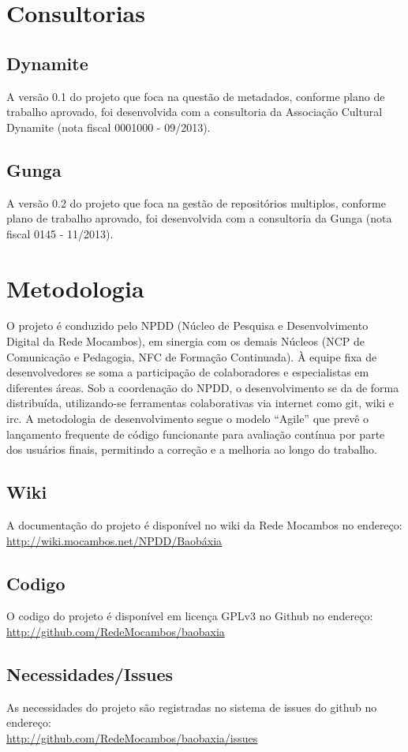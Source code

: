 \section{Consultorias}
\subsection{Dynamite}
A versão 0.1 do projeto que foca na questão de metadados, conforme
plano de trabalho aprovado, foi desenvolvida com a consultoria da
Associação Cultural Dynamite (nota fiscal 0001000 - 09/2013).

\subsection{Gunga}
A versão 0.2 do projeto que foca na gestão de repositórios multiplos,
conforme plano de trabalho aprovado, foi desenvolvida com a
consultoria da Gunga (nota fiscal 0145 - 11/2013).


\section{Metodologia}
O projeto é conduzido pelo NPDD (Núcleo de Pesquisa e Desenvolvimento
Digital da Rede Mocambos), em sinergia com os demais Núcleos (NCP de
Comunicação e Pedagogia, NFC de Formação Continuada). À equipe fixa de
desenvolvedores se soma a participação de colaboradores e
especialistas em diferentes áreas. Sob a coordenação do NPDD, o
desenvolvimento se da de forma distribuída, utilizando-se ferramentas
colaborativas via internet como git, wiki e irc. A metodologia de
desenvolvimento segue o modelo ``Agile'' que prevê o lançamento
frequente de código funcionante para avaliação contínua por parte dos
usuários finais, permitindo a correção e a melhoria ao longo do
trabalho.

\subsection{Wiki}
A documentação do projeto é disponível no wiki da Rede Mocambos no
endereço: \\ \url{http://wiki.mocambos.net/NPDD/Baobáxia}

\subsection{Codigo}
O codigo do projeto é disponível em licença GPLv3 no Github no
endereço: \\ \url{http://github.com/RedeMocambos/baobaxia}

\subsection{Necessidades/Issues}
As necessidades do projeto são registradas no sistema de issues do
github no endereço:
\\ \url{http://github.com/RedeMocambos/baobaxia/issues}

